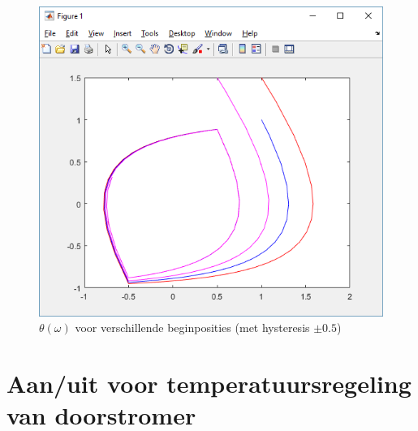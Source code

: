 \documentclass[12pt]{article}
\begin{document}
\begin{figure}
	\centering
	\includegraphics[height=0.4\textheight, keepaspectratio]{xydriehyssmaller.png}
	\caption{$\theta(\omega)$ voor verschillende beginposities (met hysteresis $\pm 0.5$)}
	\label{xydriehys}
\end{figure}
\clearpage
\part{Aan/uit voor temperatuursregeling van doorstromer}
\end{document}
